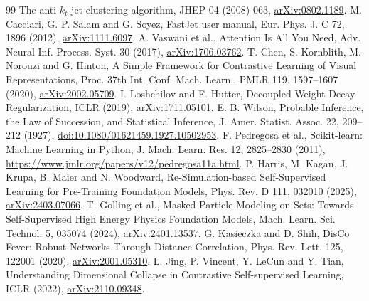 \begin{thebibliography}{99}
The anti-$k_t$ jet clustering algorithm, JHEP 04 (2008) 063,
\href{https://arxiv.org/abs/0802.1189}{arXiv:0802.1189}.
 M. Cacciari, G. P. Salam and G. Soyez,
FastJet user manual, Eur. Phys. J. C 72, 1896 (2012),
\href{https://arxiv.org/abs/1111.6097}{arXiv:1111.6097}.
 A. Vaswani et al., Attention Is All You Need,
Adv. Neural Inf. Process. Syst. 30 (2017),
\href{https://arxiv.org/abs/1706.03762}{arXiv:1706.03762}.
 T. Chen, S. Kornblith, M. Norouzi and G. Hinton,
A Simple Framework for Contrastive Learning of Visual Representations,
Proc. 37th Int. Conf. Mach. Learn., PMLR 119, 1597--1607 (2020),
\href{https://arxiv.org/abs/2002.05709}{arXiv:2002.05709}.
 I. Loshchilov and F. Hutter, Decoupled Weight Decay Regularization,
ICLR (2019), \href{https://arxiv.org/abs/1711.05101}{arXiv:1711.05101}.
 E. B. Wilson, Probable Inference, the Law of Succession, and Statistical
Inference, J. Amer. Statist. Assoc. 22, 209--212 (1927),
\href{https://doi.org/10.1080/01621459.1927.10502953}{doi:10.1080/01621459.1927.10502953}.
 F. Pedregosa et al., Scikit-learn: Machine Learning in Python,
J. Mach. Learn. Res. 12, 2825--2830 (2011),
\url{https://www.jmlr.org/papers/v12/pedregosa11a.html}.
 P. Harris, M. Kagan, J. Krupa, B. Maier and N. Woodward,
Re-Simulation-based Self-Supervised Learning for Pre-Training Foundation Models,
Phys. Rev. D 111, 032010 (2025),
\href{https://arxiv.org/abs/2403.07066}{arXiv:2403.07066}.
 T. Golling et al., Masked Particle Modeling on Sets: Towards
Self-Supervised High Energy Physics Foundation Models,
Mach. Learn. Sci. Technol. 5, 035074 (2024),
\href{https://arxiv.org/abs/2401.13537}{arXiv:2401.13537}.
 G. Kasieczka and D. Shih,
DisCo Fever: Robust Networks Through Distance Correlation,
Phys. Rev. Lett. 125, 122001 (2020),
\href{https://arxiv.org/abs/2001.05310}{arXiv:2001.05310}.
 L. Jing, P. Vincent, Y. LeCun and Y. Tian,
Understanding Dimensional Collapse in Contrastive Self-supervised Learning,
ICLR (2022), \href{https://arxiv.org/abs/2110.09348}{arXiv:2110.09348}.
\end{thebibliography}
